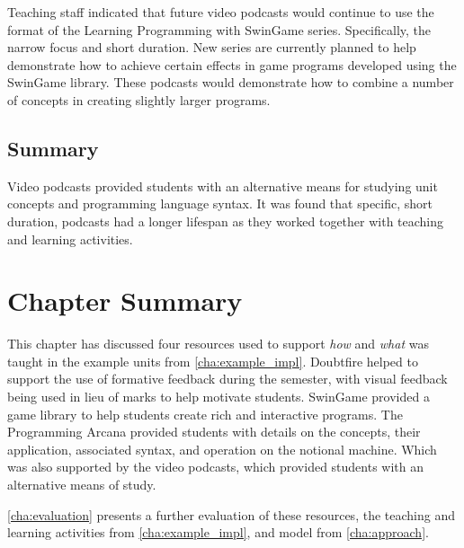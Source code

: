 Teaching staff indicated that future video podcasts would continue to use the format of the Learning Programming with SwinGame series. Specifically, the narrow focus and short duration. New series are currently planned to help demonstrate how to achieve certain effects in game programs developed using the SwinGame library. These podcasts would demonstrate how to combine a number of concepts in creating slightly larger programs.


\subsection{Summary} %
\label{sub:vodcast_summary}

Video podcasts provided students with an alternative means for studying unit concepts and programming language syntax. It was found that specific, short duration, podcasts had a longer lifespan as they worked together with teaching and learning activities.








\clearpage
\section{Chapter Summary} %
\label{sec:supporting_summary}

This chapter has discussed four resources used to support \emph{how} and \emph{what} was taught in the example units from \cref{cha:example_impl}. Doubtfire helped to support the use of formative feedback during the semester, with visual feedback being used in lieu of marks to help motivate students. SwinGame provided a game library to help students create rich and interactive programs. The Programming Arcana provided students with details on the concepts, their application, associated syntax, and operation on the notional machine. Which was also supported by the video podcasts, which provided students with an alternative means of study.

\cref{cha:evaluation} presents a further evaluation of these resources, the teaching and learning activities from \cref{cha:example_impl}, and model from \cref{cha:approach}.



